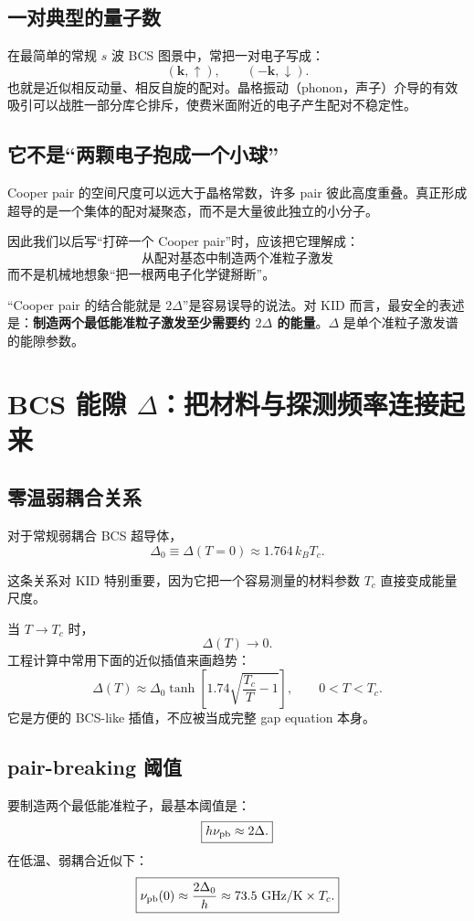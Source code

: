 \documentclass[11pt,a4paper,openany]{ctexrep}
\begin{document}
\subsection{一对典型的量子数}
在最简单的常规 $s$ 波 BCS 图景中，常把一对电子写成：
\[
(\mathbf{k},\uparrow),\qquad(-\mathbf{k},\downarrow).
\]
也就是近似相反动量、相反自旋的配对。晶格振动（phonon，声子）介导的有效吸引可以战胜一部分库仑排斥，使费米面附近的电子产生配对不稳定性。

\subsection{它不是“两颗电子抱成一个小球”}
Cooper pair 的空间尺度可以远大于晶格常数，许多 pair 彼此高度重叠。真正形成超导的是一个集体的配对凝聚态，而不是大量彼此独立的小分子。

因此我们以后写“打碎一个 Cooper pair”时，应该把它理解成：
\[
\boxed{\text{从配对基态中制造两个准粒子激发}}
\]
而不是机械地想象“把一根两电子化学键掰断”。

\begin{mistakebox}
“Cooper pair 的结合能就是 $2\Delta$”是容易误导的说法。对 KID 而言，最安全的表述是：\textbf{制造两个最低能准粒子激发至少需要约 $2\Delta$ 的能量}。$\Delta$ 是单个准粒子激发谱的能隙参数。
\end{mistakebox}

\section{BCS 能隙 $\Delta$：把材料与探测频率连接起来}

\subsection{零温弱耦合关系}
对于常规弱耦合 BCS 超导体，
\[
\boxed{\Delta_0\equiv\Delta(T=0)\approx1.764\,k_B T_c.}
\]

这条关系对 KID 特别重要，因为它把一个容易测量的材料参数 $T_c$ 直接变成能量尺度。

当 $T\rightarrow T_c$ 时，
\[
\Delta(T)\rightarrow0.
\]
工程计算中常用下面的近似插值来画趋势：
\[
\Delta(T)\approx
\Delta_0\tanh\!\left[
1.74\sqrt{\frac{T_c}{T}-1}
\right],\qquad 0<T<T_c.
\]
它是方便的 BCS-like 插值，不应被当成完整 gap equation 本身。

\subsection{pair-breaking 阈值}
要制造两个最低能准粒子，最基本阈值是：
\[
\boxed{h\nu_{\rm pb}\approx2\Delta.}
\]
在低温、弱耦合近似下：
\[
\boxed{
\nu_{\rm pb}(0)
\approx
\frac{2\Delta_0}{h}
\approx
73.5\ \mathrm{GHz/K}\times T_c.
}
\]
\end{document}
